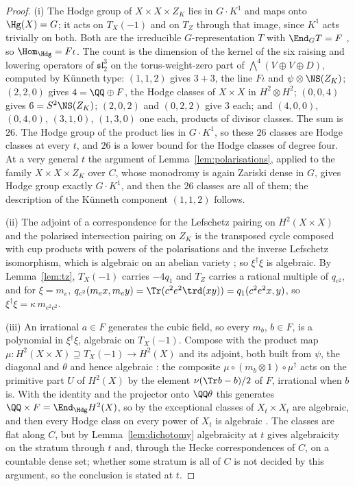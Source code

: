 \begin{proof}
(i) The Hodge group of $X\times X\times Z_{K}$ lies in $G\cdot K^{1}$ and maps onto $\Hg(X)=G$; it acts on $T_{X}(-1)$ and on $T_{Z}$ through that image, since $K^{1}$ acts trivially on both. Both are the irreducible $G$-representation $T$ with $\End_{G}T=F$ \cite[Prop.~21.2]{BMB26}, so $\Hom_{\Hdg}=F\iota$. The count is the dimension of the kernel of the six raising and lowering operators of $\mathfrak{sl}_{2}^{3}$ on the torus-weight-zero part of $\bigwedge^{4}(V\oplus V\oplus D)$, computed by K\"unneth type: $(1,1,2)$ gives $3+3$, the line $F\iota$ and $\psi\otimes\NS(Z_{K})$; $(2,2,0)$ gives $4=\QQ\oplus F$, the Hodge classes of $X\times X$ in $H^{2}\otimes H^{2}$; $(0,0,4)$ gives $6=S^{2}\NS(Z_{K})$; $(2,0,2)$ and $(0,2,2)$ give $3$ each; and $(4,0,0)$, $(0,4,0)$, $(3,1,0)$, $(1,3,0)$ one each, products of divisor classes. The sum is $26$. The Hodge group of the product lies in $G\cdot K^{1}$, so these $26$ classes are Hodge classes at every $t$, and $26$ is a lower bound for the Hodge classes of degree four. At a very general $t$ the argument of Lemma~\ref{lem:polarisations}, applied to the family $X\times X\times Z_{K}$ over $C$, whose monodromy is again Zariski dense in $G$, gives Hodge group exactly $G\cdot K^{1}$, and then the $26$ classes are all of them; the description of the K\"unneth component $(1,1,2)$ follows.

(ii) The adjoint of a correspondence for the Lefschetz pairing on $H^{2}(X\times X)$ and the polarised intersection pairing on $Z_{K}$ is the transposed cycle composed with cup products with powers of the polarisations and the inverse Lefschetz isomorphism, which is algebraic on an abelian variety \cite[\S2]{Kle68}; so $\xi^{\dagger}\xi$ is algebraic. By Lemma~\ref{lem:tz}, $T_{X}(-1)$ carries $-4q_{1}$ and $T_{Z}$ carries a rational multiple of $q_{c^{2}}$, and for $\xi=m_{e}$, $q_{c^{2}}(m_{e}x,m_{e}y)=\Tr(c^{2}e^{2}\trd(xy))=q_{1}(c^{2}e^{2}x,y)$, so $\xi^{\dagger}\xi=\kappa\,m_{e^{2}c^{2}}$.

(iii) An irrational $a\in F$ generates the cubic field, so every $m_{b}$, $b\in F$, is a polynomial in $\xi^{\dagger}\xi$, algebraic on $T_{X}(-1)$. Compose with the product map $\mu\colon H^{2}(X\times X)\supseteq T_{X}(-1)\to H^{2}(X)$ and its adjoint, both built from $\psi$, the diagonal and $\theta$ and hence algebraic \cite[Lem.~21.3]{BMB26}: the composite $\mu\circ(m_{b}\otimes1)\circ\mu^{\dagger}$ acts on the primitive part $U$ of $H^{2}(X)$ by the element $\nu(\Tr b-b)/2$ of $F$, irrational when $b$ is. With the identity and the projector onto $\QQ\theta$ this generates $\QQ\times F=\End_{\Hdg}H^{2}(X)$, so by \cite[Prop.~21.2]{BMB26} the exceptional classes of $X_{t}\times X_{t}$ are algebraic, and then every Hodge class on every power of $X_{t}$ is algebraic \cite[Thm.~21.7]{BMB26}. The classes are flat along $C$, but by Lemma~\ref{lem:dichotomy} algebraicity at $t$ gives algebraicity on the stratum through $t$ and, through the Hecke correspondences of $C$, on a countable dense set; whether some stratum is all of $C$ is not decided by this argument, so the conclusion is stated at $t$.


\end{proof}
